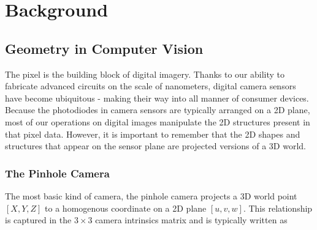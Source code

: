 
\chapter{Background}


\section{Geometry in Computer Vision}

The pixel is the building block of digital imagery. Thanks to our ability to fabricate advanced circuits on the scale of nanometers, digital camera sensors have become ubiquitous - making their way into all manner of consumer devices. Because the photodiodes in camera sensors are typically arranged on a 2D plane, most of our operations on digital images manipulate the 2D structures present in that pixel data. However, it is important to remember that the 2D shapes and structures that appear on the sensor plane are projected versions of a 3D world. 

\subsection{The Pinhole Camera}

The most basic kind of camera, the pinhole camera projects a 3D world point $[X, Y, Z]$ to a homogenous coordinate on a 2D plane $[u, v, w]$. This relationship is captured in the $3 \times 3$ camera intrinsics matrix and is typically written as 

